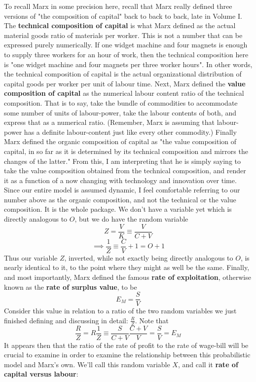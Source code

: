 \documentclass{article}
\theoremstyle{definition}
\theoremstyle{plain}
\theoremstyle{theorem}
\begin{document}
To recall Marx in some precision here, recall that Marx really defined three versions of "the composition of capital" back to back to back, late in Volume I. The \textbf{technical composition of capital} is what Marx defined as the actual material goods ratio of materials per worker. This is not a number that can be expressed purely numerically. If one widget machine and four magnets is enough to supply three workers for an hour of work, then the technical composition here is "one widget machine and four magnets per three worker hours". In other words, the technical composition of capital is the actual organizational distribution of capital goods per worker per unit of labour time. Next, Marx defined the \textbf{value composition of capital} as the numerical labour content ratio of the technical composition. That is to say, take the bundle of commodities to accommodate some number of units of labour-power, take the labour contents of both, and express that as a numerical ratio. (Remember, Marx is assuming that labour-power has a definite labour-content just like every other commodity.) Finally Marx defined the organic composition of capital as "the value composition of capital, in so far as it is determined by its technical composition and mirrors the changes of the latter." From this, I am interpreting that he is simply saying to take the value composition obtained from the technical composition, and render it as a function of a now changing with technology and innovation over time. Since our entire model is assumed dynamic, I feel comfortable referring to our number above as the organic composition, and not the technical or the value composition. It is the whole package. We don't have a variable yet which is directly analogous to $O$, but we do have the random variable 
\[ Z = \frac{V}{K} \equiv \frac{V}{C+V} \]
\[ \implies \frac{1}{Z} \equiv \frac{C}{V}+1 = O+1 \]
Thus our variable $Z$, inverted, while not exactly being directly analogous to $O$, is nearly identical to it, to the point where they might as well be the same. Finally, and most importantly, Marx defined the famous \textbf{rate of exploitation}, otherwise known as the \textbf{rate of surplus value}, to be
\[ E_M = \frac{S}{V} \]
Consider this value in relation to a ratio of the two random variables we just finished defining and discussing in detail: $\frac{R}{Z}$. Note that
\[ \frac{R}{Z} = R\frac{1}{Z} \equiv \frac{S}{C+V}\frac{C+V}{V} = \frac{S}{V} = E_M \]
It appears then that the ratio of the rate of profit to the rate of wage-bill will be crucial to examine in order to examine the relationship between this probabilistic model and Marx's own. We'll call this random variable $X$, and call it \textbf{rate of capital versus labour}:
\end{document}
